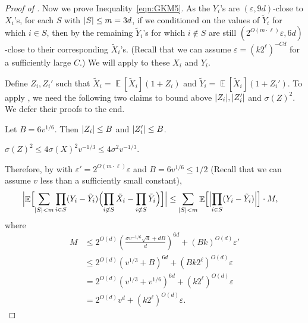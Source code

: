 \documentclass{toc}
\def\eps{\varepsilon}
\def\Blocklength{\ell}
\DeclarePairedDelimiter{\abs}{\lvert}{\rvert}
\DeclareMathOperator*{\E}{\mathbb{E}}                 %
\begin{document}
\begin{proof}[Proof of {}]
    \medskip

    Now we prove Inequality~\eqref{eqn:GKM5}.
    As the $Y_i$'s are $(\eps, 9d)$-close to $X_i$'s, for each $S$ with $\abs{S} \le m = 3d$, if we conditioned on the values of $\tilde Y_i$ for which $i \in S$, then by  the remaining $\tilde Y_i$'s for which $i \not\in S$ are still $(2^{O(m \cdot \Blocklength)} \eps, 6d)$-close to their corresponding $\tilde X_i$'s.
    (Recall that we can assume $\eps = (k2^\Blocklength)^{-Cd}$ for a sufficiently large $C$.)
    We will apply  to these $X_i$ and $Y_i$.

    \medskip

    Define $Z_i, Z_i'$ such that $\tilde X_i = \E[\tilde X_i](1 + Z_i)$ and $\tilde Y_i = \E[\tilde X_i](1 + Z_i')$.
    To apply , we need the following two claims to bound above $\abs{Z_i}, \abs{Z_i'}$ and $\sigma(Z)^2$.
    We defer their proofs to the end.
    \begin{claim} \label{claim-norm-of-tilde-Z}
      Let $B = 6 v^{1/6}$.
      Then $\abs{Z_i} \le B$ and $\abs{Z_i'} \le B$.
    \end{claim}

    \begin{claim} \label{claim-var-of-tilde-Z}
      $\sigma(Z)^2 \le 4 \sigma(X)^2 v^{-1/3} \le 4 \sigma^2 v^{-1/3}$.
    \end{claim}

    Therefore, by  with $\eps' = 2^{O(m \cdot \Blocklength)} \eps$ and $B = 6 v^{1/6} \le 1/2$ (Recall that we can assume $v$ less than a sufficiently small constant),
    \begin{align*}
      \Bigl| \E \Bigl[ \sum_{\abs{S} < m} \prod_{i \in S} (Y_i - \tilde Y_i) \Bigl( \prod_{i \not\in S} \tilde X_i - \prod_{i \not\in S} \tilde Y_i \Bigr) \Bigr] \Bigr|
      &\le \sum_{\abs{S} < m} \E \Bigl[ \Bigl| \prod_{i \in S} (Y_i - \tilde Y_i) \Bigr| \Bigr] \cdot M ,
    \end{align*}
    where
    \begin{align*}
      M
      &\le 2^{O(d)} \left( \frac{ \sigma v^{-1/6} \sqrt{d} + dB } {d} \right)^{6d} + (B k)^{O(d)} \eps' \\
      &\le 2^{O(d)} ( v^{1/3} + B )^{6d} + (B k 2^\Blocklength)^{O(d)} \eps \\
      &= 2^{O(d)} \left( v^{1/3}  + v^{1/6} \right)^{6d} + (k 2^\Blocklength)^{O(d)} \eps \\
      &= 2^{O(d)} v^d + (k 2^\Blocklength)^{O(d)} \eps .
    \end{align*}


\end{proof}
\end{document}
